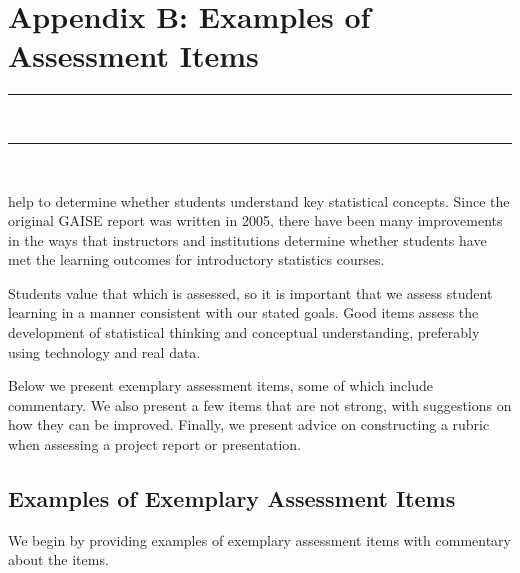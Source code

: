 \chapter{Appendix B: Examples of Assessment Items}
\vspace{-.53in}
   \noindent\color{graylight}\rule[0cm]{3.25in}{0.03cm} \\
    \noindent\color{graylight}\rule[0.4cm]{3.25in}{0.03cm} \\
\color{black}






 help to determine whether students understand key statistical concepts.  Since the original GAISE report was written in 2005, there have been many improvements in the ways that instructors and institutions determine whether students have met the learning outcomes for introductory statistics courses.  

Students value that which is assessed, 
so it is important that we assess student learning in a manner consistent with our stated goals. Good items assess the development of statistical thinking and conceptual understanding, preferably using technology and real data.

Below we present exemplary assessment items, some of which include commentary. We also present a few items that are not strong, with suggestions on how they can be improved. Finally, we present advice on constructing a rubric when assessing a project report or presentation.


\section{\textbf{Examples of Exemplary Assessment Items}}
We begin by providing examples of exemplary assessment items with commentary about the items.

